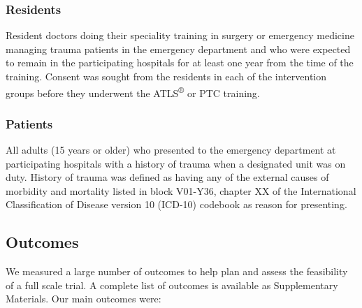 \documentclass[
]{article}
\begin{document}
\hypertarget{residents}{%
\subsubsection{Residents}\label{residents}}

Resident doctors doing their speciality training in surgery or emergency medicine managing trauma patients in the emergency department and who were expected to remain in the participating hospitals for at least one year from the time of the training. Consent was sought from the residents in each of the intervention groups before they underwent the ATLS\textsuperscript{®} or PTC training.

\hypertarget{patients}{%
\subsubsection{Patients}\label{patients}}

All adults (15 years or older) who presented to the emergency department at participating hospitals with a history of trauma when a designated unit was on duty. History of trauma was defined as having any of the external causes of morbidity and mortality listed in block V01-Y36, chapter XX of the International Classification of Disease version 10 (ICD-10) codebook as reason for presenting.

\hypertarget{outcomes}{%
\subsection{Outcomes}\label{outcomes}}

We measured a large number of outcomes to help plan and assess the feasibility of a full scale trial. A complete list of outcomes is available as Supplementary Materials. Our main outcomes were:
\end{document}

